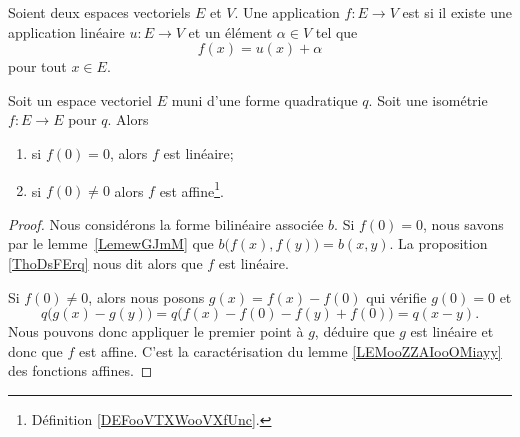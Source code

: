 {}

\begin{definition}      \label{DEFooVTXWooVXfUnc}
	Soient deux espaces vectoriels \( E\) et \( V\). Une application \( f\colon E\to V\) est  si il existe une application linéaire \( u\colon E \to V\) et un élément \( \alpha\in V\) tel que
	\begin{equation}
		f(x)=u(x)+\alpha
	\end{equation}
	pour tout \( x\in E\).
\end{definition}

\begin{theorem}
	Soit un espace vectoriel \( E\) muni d'une forme quadratique \( q\). Soit une isométrie \( f\colon E\to E\) pour \( q\). Alors
	\begin{enumerate}
		\item
		      si \( f(0)=0\), alors \( f\) est linéaire;
		\item
		      si \( f(0)\neq 0\) alors \( f\) est affine\footnote{Définition \ref{DEFooVTXWooVXfUnc}.}.
	\end{enumerate}
\end{theorem}

\begin{proof}
	Nous considérons la forme bilinéaire associée \( b\). Si \( f(0)=0\), nous savons par le lemme~\ref{LemewGJmM} que \( b\big( f(x),f(y) \big)=b(x,y)\). La proposition \ref{ThoDsFErq} nous dit alors que \( f\) est linéaire.


	Si \( f(0)\neq 0\), alors nous posons \( g(x)=f(x)-f(0)\) qui vérifie \( g(0)=0\) et
	\begin{equation}
		q\big( g(x)-g(y) \big)=q\big( f(x)-f(0)-f(y)+f(0) \big)=q(x-y).
	\end{equation}
	Nous pouvons donc appliquer le premier point à \( g\), déduire que \( g\) est linéaire et donc que \( f\) est affine. C'est la caractérisation du lemme \ref{LEMooZZAIooOMiayy} des fonctions affines.
\end{proof}

